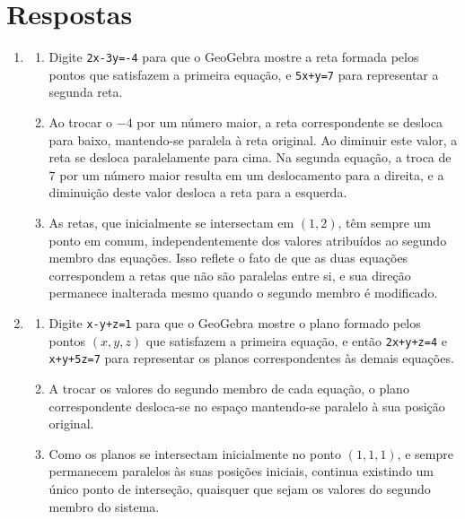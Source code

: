 \documentclass[12pt,a4paper]{article}
\begin{document}
\section*{Respostas}
\begin{enumerate}
\item \begin{enumerate}
\item Digite \texttt{2x-3y=-4} para que o GeoGebra mostre a reta formada pelos pontos que satisfazem a primeira equação, e \texttt{5x+y=7} para representar a segunda reta.
\item Ao trocar o $-4$ por um número maior, a reta correspondente se desloca para baixo, mantendo-se paralela à reta original. Ao diminuir este valor, a reta se desloca paralelamente para cima. Na segunda equação, a troca de $7$ por um número maior resulta em um deslocamento para a direita, e a diminuição deste valor desloca a reta para a esquerda.

\item As retas, que inicialmente se intersectam em $(1,2)$, têm sempre um ponto em comum, independentemente dos valores atribuídos ao segundo membro das equações. Isso reflete o fato de que as duas equações correspondem a retas que não são paralelas entre si, e sua direção permanece inalterada mesmo quando o segundo membro é modificado.
\end{enumerate}


\item
\begin{enumerate}
\item Digite \texttt{x-y+z=1} para que o GeoGebra mostre o plano formado pelos pontos $(x,y,z)$ que satisfazem a primeira equação, e então \texttt{2x+y+z=4} e \texttt{x+y+5z=7} para representar os planos correspondentes às demais equações.
\item A trocar os valores do segundo membro de cada equação, o plano correspondente desloca-se no espaço mantendo-se paralelo à sua posição original.

\item Como os planos se intersectam inicialmente no ponto $(1,1,1)$, e sempre permanecem paralelos às suas posições iniciais, continua existindo um único ponto de interseção, quaisquer que sejam os valores do segundo membro do sistema.
\end{enumerate}


\end{enumerate}
\end{document}
